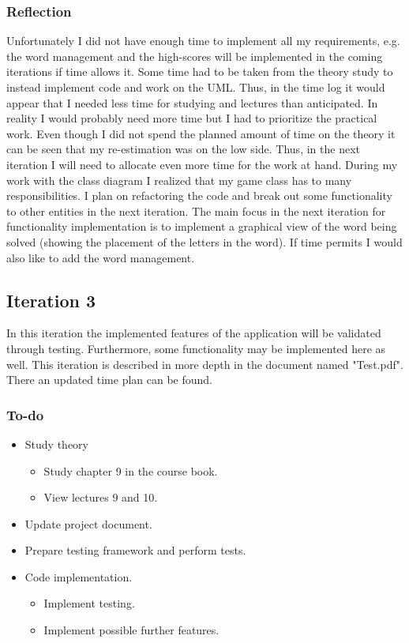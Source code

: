 \documentclass[12pt, letterpaper]{article}
\begin{document}
\subsubsection{Reflection}
Unfortunately I did not have enough time to implement all my requirements, e.g. the word management and the high-scores will be implemented in the coming iterations if time allows it. Some time had to be taken from the theory study to instead implement code and work on the UML. Thus, in the time log it would appear that I needed less time for studying and lectures than anticipated. In reality I would probably need more time but I had to prioritize the practical work. Even though I did not spend the planned amount of time on the theory it can be seen that my re-estimation was on the low side. Thus, in the next iteration I will need to allocate even more time for the work at hand.
\newline
\newline
During my work with the class diagram I realized that my game class has to many responsibilities. I plan on refactoring the code and break out some functionality to other entities in the next iteration. The main focus in the next iteration for functionality implementation is to implement a graphical view of the word being solved (showing the placement of the letters in the word). If time permits I would also like to add the word management.
\subsection{Iteration 3}
In this iteration the implemented features of the application will be validated through testing. Furthermore, some functionality may be implemented here as well. This iteration is described in more depth in the document named "Test.pdf". There an updated time plan can be found.
\subsubsection{To-do}
\begin{itemize}
	\item Study theory
	\begin{itemize}
		\item Study chapter 9 in the course book.
		\item View lectures 9 and 10.
	\end{itemize}
	\item Update project document.
	\item Prepare testing framework and perform tests.
	\item Code implementation.
	\begin{itemize}
		\item Implement testing.
		\item Implement possible further features.
	\end{itemize}
\end{itemize}
\end{document}
